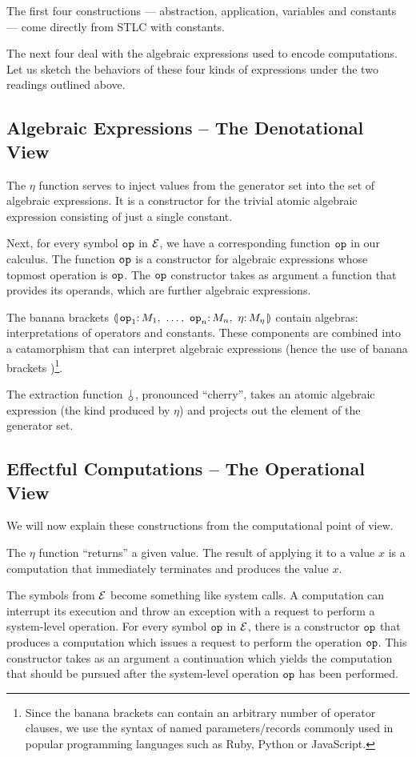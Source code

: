 The first four constructions --- abstraction, application, variables and
constants --- come directly from STLC with constants.

The next four deal with the algebraic expressions used to encode
computations. Let us sketch the behaviors of these four kinds of
expressions under the two readings outlined above.

\subsection*{Algebraic Expressions -- The Denotational View}

The $\eta$ function serves to inject values from the generator set into the
set of algebraic expressions. It is a constructor for the trivial atomic
algebraic expression consisting of just a single constant.

Next, for every symbol $\mathtt{op}$ in $\mathcal{E}$, we have a corresponding function
$\mathtt{op}$ in our calculus. The function $\mathtt{op}$ is a constructor for
algebraic expressions whose topmost operation is $\mathtt{op}$. The $\mathtt{op}$
constructor takes as argument a function that provides its operands, which
are further algebraic expressions.

The banana brackets $\cdbanana$ contain algebras: interpretations of
operators and constants. These components are combined into a catamorphism
that can interpret algebraic expressions (hence the use of banana brackets
\cite{meijer1991functional})\footnote{Since the banana brackets can contain
  an arbitrary number of operator clauses, we use the syntax of named
  parameters/records commonly used in popular programming languages such as
  Ruby, Python or JavaScript.}.

The extraction function $\cherry$, pronounced ``cherry'', takes an atomic
algebraic expression (the kind produced by $\eta$) and projects out the
element of the generator set.

\subsection*{Effectful Computations -- The Operational View}

We will now explain these constructions from the computational point of
view.

The $\eta$ function ``returns'' a given value. The result of applying it to
a value $x$ is a computation that immediately terminates and produces the
value $x$.

The symbols from $\mathcal{E}$ become something like system calls. A computation
can interrupt its execution and throw an exception with a request to
perform a system-level operation. For every symbol $\mathtt{op}$ in $\mathcal{E}$,
there is a constructor $\mathtt{op}$ that produces a computation which issues a
request to perform the operation $\mathtt{op}$. This constructor takes as an
argument a continuation which yields the computation that should be pursued
after the system-level operation $\mathtt{op}$ has been performed.

